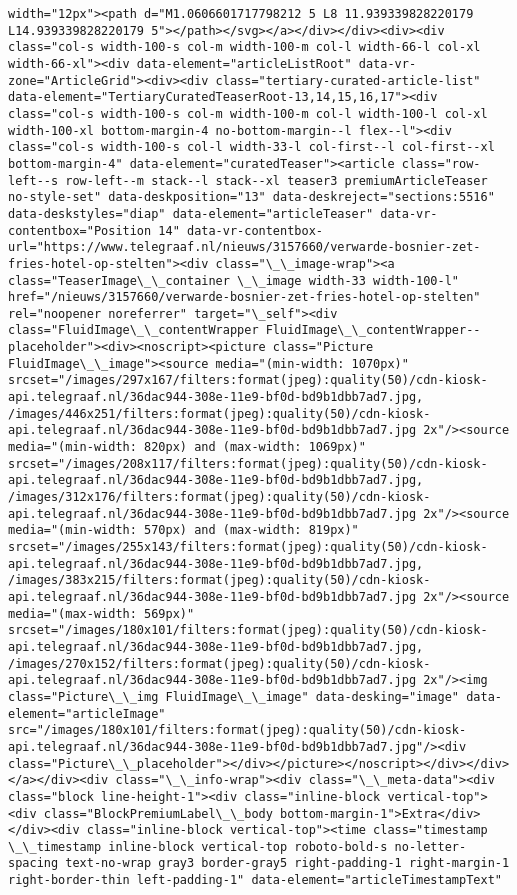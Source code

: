 \documentclass[11pt]{article}
\begin{document}
\begin{Verbatim}[commandchars=\\\{\}]
width="12px"><path d="M1.0606601717798212 5 L8 11.939339828220179 L14.939339828220179 5"></path></svg></a></div></div><div><div class="col-s width-100-s col-m width-100-m col-l width-66-l col-xl width-66-xl"><div data-element="articleListRoot" data-vr-zone="ArticleGrid"><div><div class="tertiary-curated-article-list" data-element="TertiaryCuratedTeaserRoot-13,14,15,16,17"><div class="col-s width-100-s col-m width-100-m col-l width-100-l col-xl width-100-xl bottom-margin-4 no-bottom-margin--l flex--l"><div class="col-s width-100-s col-l width-33-l col-first--l col-first--xl bottom-margin-4" data-element="curatedTeaser"><article class="row-left--s row-left--m stack--l stack--xl teaser3 premiumArticleTeaser no-style-set" data-deskposition="13" data-deskreject="sections:5516" data-deskstyles="diap" data-element="articleTeaser" data-vr-contentbox="Position 14" data-vr-contentbox-url="https://www.telegraaf.nl/nieuws/3157660/verwarde-bosnier-zet-fries-hotel-op-stelten"><div class="\_\_image-wrap"><a class="TeaserImage\_\_container \_\_image width-33 width-100-l" href="/nieuws/3157660/verwarde-bosnier-zet-fries-hotel-op-stelten" rel="noopener noreferrer" target="\_self"><div class="FluidImage\_\_contentWrapper FluidImage\_\_contentWrapper--placeholder"><div><noscript><picture class="Picture FluidImage\_\_image"><source media="(min-width: 1070px)" srcset="/images/297x167/filters:format(jpeg):quality(50)/cdn-kiosk-api.telegraaf.nl/36dac944-308e-11e9-bf0d-bd9b1dbb7ad7.jpg, /images/446x251/filters:format(jpeg):quality(50)/cdn-kiosk-api.telegraaf.nl/36dac944-308e-11e9-bf0d-bd9b1dbb7ad7.jpg 2x"/><source media="(min-width: 820px) and (max-width: 1069px)" srcset="/images/208x117/filters:format(jpeg):quality(50)/cdn-kiosk-api.telegraaf.nl/36dac944-308e-11e9-bf0d-bd9b1dbb7ad7.jpg, /images/312x176/filters:format(jpeg):quality(50)/cdn-kiosk-api.telegraaf.nl/36dac944-308e-11e9-bf0d-bd9b1dbb7ad7.jpg 2x"/><source media="(min-width: 570px) and (max-width: 819px)" srcset="/images/255x143/filters:format(jpeg):quality(50)/cdn-kiosk-api.telegraaf.nl/36dac944-308e-11e9-bf0d-bd9b1dbb7ad7.jpg, /images/383x215/filters:format(jpeg):quality(50)/cdn-kiosk-api.telegraaf.nl/36dac944-308e-11e9-bf0d-bd9b1dbb7ad7.jpg 2x"/><source media="(max-width: 569px)" srcset="/images/180x101/filters:format(jpeg):quality(50)/cdn-kiosk-api.telegraaf.nl/36dac944-308e-11e9-bf0d-bd9b1dbb7ad7.jpg, /images/270x152/filters:format(jpeg):quality(50)/cdn-kiosk-api.telegraaf.nl/36dac944-308e-11e9-bf0d-bd9b1dbb7ad7.jpg 2x"/><img class="Picture\_\_img FluidImage\_\_image" data-desking="image" data-element="articleImage" src="/images/180x101/filters:format(jpeg):quality(50)/cdn-kiosk-api.telegraaf.nl/36dac944-308e-11e9-bf0d-bd9b1dbb7ad7.jpg"/><div class="Picture\_\_placeholder"></div></picture></noscript></div></div></a></div><div class="\_\_info-wrap"><div class="\_\_meta-data"><div class="block line-height-1"><div class="inline-block vertical-top"><div class="BlockPremiumLabel\_\_body bottom-margin-1">Extra</div></div><div class="inline-block vertical-top"><time class="timestamp \_\_timestamp inline-block vertical-top roboto-bold-s no-letter-spacing text-no-wrap gray3 border-gray5 right-padding-1 right-margin-1 right-border-thin left-padding-1" data-element="articleTimestampText" 
\end{Verbatim}
\end{document}
